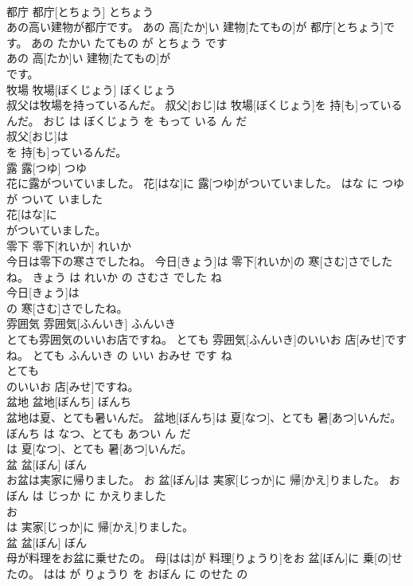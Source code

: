 \documentclass[8pt]{extreport}
\begin{document}
\begin{CJK}{UTF8}{min}
\\	都庁	都庁[とちょう]	とちょう	
\\	あの高い建物が都庁です。	あの 高[たか]い 建物[たてもの]が 都庁[とちょう]です。	あの たかい たてもの が とちょう です	
\\	あの 高[たか]い 建物[たてもの]が
\\	です。			
\\	牧場	牧場[ぼくじょう]	ぼくじょう	
\\	叔父は牧場を持っているんだ。	叔父[おじ]は 牧場[ぼくじょう]を 持[も]っているんだ。	おじ は ぼくじょう を もって いる ん だ	
\\	叔父[おじ]は
\\	を 持[も]っているんだ。			
\\	露	露[つゆ]	つゆ	
\\	花に露がついていました。	花[はな]に 露[つゆ]がついていました。	はな に つゆ が ついて いました	
\\	花[はな]に
\\	がついていました。			
\\	零下	零下[れいか]	れいか	
\\	今日は零下の寒さでしたね。	今日[きょう]は 零下[れいか]の 寒[さむ]さでしたね。	きょう は れいか の さむさ でした ね	
\\	今日[きょう]は
\\	の 寒[さむ]さでしたね。			
\\	雰囲気	雰囲気[ふんいき]	ふんいき	
\\	とても雰囲気のいいお店ですね。	とても 雰囲気[ふんいき]のいいお 店[みせ]ですね。	とても ふんいき の いい おみせ です ね	
\\	とても
\\	のいいお 店[みせ]ですね。			
\\	盆地	盆地[ぼんち]	ぼんち	
\\	盆地は夏、とても暑いんだ。	盆地[ぼんち]は 夏[なつ]、とても 暑[あつ]いんだ。	ぼんち は なつ、とても あつい ん だ	
\\	は 夏[なつ]、とても 暑[あつ]いんだ。			
\\	盆	盆[ぼん]	ぼん	
\\	お盆は実家に帰りました。	お 盆[ぼん]は 実家[じっか]に 帰[かえ]りました。	お ぼん は じっか に かえりました	
\\	お
\\	は 実家[じっか]に 帰[かえ]りました。			
\\	盆	盆[ぼん]	ぼん	
\\	母が料理をお盆に乗せたの。	母[はは]が 料理[りょうり]をお 盆[ぼん]に 乗[の]せたの。	はは が りょうり を おぼん に のせた の	

\end{CJK}
\end{document}
